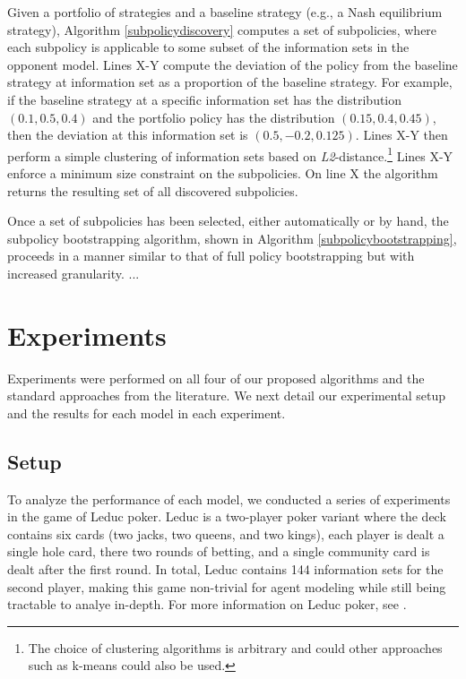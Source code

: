 \documentclass{aamas2013}
\begin{document}
    Given a portfolio of strategies and a baseline strategy (e.g., a Nash equilibrium strategy), Algorithm \ref{subpolicydiscovery} computes a set of subpolicies, where each subpolicy is applicable to some subset of the information sets in the opponent model. Lines X-Y compute the deviation of the policy from the baseline strategy at information set as a proportion of the baseline strategy. For example, if the baseline strategy at a specific information set has the distribution $(0.1,0.5,0.4)$ and the portfolio policy has the distribution $(0.15, 0.4, 0.45)$, then the deviation at this information set is $(0.5, -0.2, 0.125)$. Lines X-Y then perform a simple clustering of information sets based on \textit{L2}-distance.\footnote{The choice of clustering algorithms is arbitrary and could other approaches such as k-means could also be used.} Lines X-Y enforce a minimum size constraint on the subpolicies. On line X the algorithm returns the resulting set of all discovered subpolicies.

    Once a set of subpolicies has been selected, either automatically or by hand, the subpolicy bootstrapping algorithm, shown in Algorithm \ref{subpolicybootstrapping}, proceeds in a manner similar to that of full policy bootstrapping but with increased granularity. ...

\section{Experiments}
Experiments were performed on all four of our proposed algorithms and the standard approaches from the literature. We next detail our experimental setup and the results for each model in each experiment.

    \subsection{Setup}
    To analyze the performance of each model, we conducted a series of experiments in the game of Leduc poker. Leduc is a two-player poker variant where the deck contains six cards (two jacks, two queens, and two kings), each player is dealt a single hole card, there two rounds of betting, and a single community card is dealt after the first round. In total, Leduc contains 144 information sets for the second player, making this game non-trivial for agent modeling while still being tractable to analye in-depth. For more information on Leduc poker, see \cite{bayesbluff}.
\end{document}
